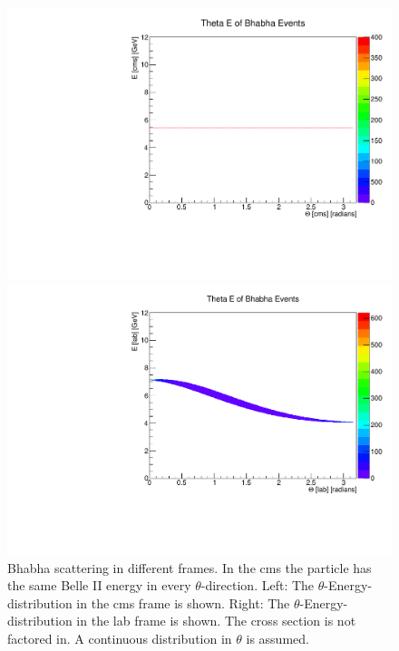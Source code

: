 \documentclass[a4paper,11pt,twosided,final,german,openbib,pdftex,listof=totoc,bibliography=totoc]{scrbook}
\begin{document}
\begin{figure}[h!]
	\centering
	\begin{minipage}[b]{0.45\linewidth}
		\centering
		\includegraphics[width=\textwidth]{Bilder/theta_cms}
	\end{minipage}
	\hspace{0.5cm}
	\begin{minipage}[b]{0.45\linewidth}
		\centering
		\includegraphics[width=\textwidth]{Bilder/theta_lab}
	\end{minipage}
	\caption[$\theta$-Energy-Distribution In The CMS And LAB Frame]{Bhabha scattering in different frames. In the cms the particle has the same Belle II energy in every $\theta$-direction. Left: The $\theta$-Energy-distribution in the cms frame is shown. Right: The $\theta$-Energy-distribution in the lab frame is shown. The cross section is not factored in. A continuous distribution in $\theta$ is assumed.}

\end{figure}
\end{document}
